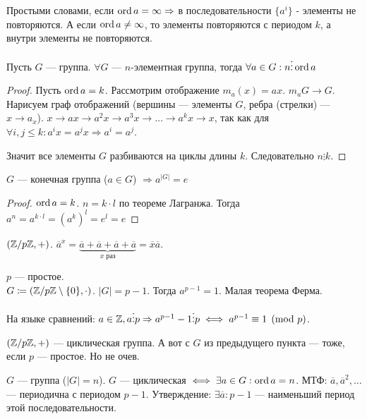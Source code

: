 \slashn
Простыми словами, если $\operatorname{ord} a = \infty \Rightarrow$ в последовательности $\{a^i\}$ - элементы не повторяются. А если  $\operatorname{ord} a \neq \infty$, то элементы повторяются с периодом $k$, а внутри элементы не повторяются. 
\begin{theorem}
    Пусть $G$ --- группа.  $\forall G$ ---  $n$-элементная группа, тогда  $\forall a \in G: n \vdots \operatorname{ord} a$
\end{theorem}
\begin{proof}
    Пусть $\operatorname{ord} a = k$.
    Рассмотрим отображение $m_a(x) = ax$. $m_a G \to G$. Нарисуем граф отображений (вершины --- элементы $G$, ребра (стрелки) ---  $x \to a_x$). $x \to ax \to a^2x \to a^3x \to \ldots \to a^kx \to x$, так как для $\forall i, j \le k: a^i x = a^j x \Rightarrow a^i = a^j$. 

    Значит все элементы $G$ разбиваются на циклы длины  $k$. Следовательно $n \vdots k$.
\end{proof}
\begin{consequence}
    $G$ --- конечная группа ($a \in G$) $\Rightarrow a^{|G|} = e$
\end{consequence}
\begin{proof}
    $\operatorname{ord} a = k$.  $n = k \cdot l$ по теореме Лагранжа. Тогда  $a^n = a^{k\cdot l} = \left(a^k\right)^l = e^l = e$
\end{proof}
\begin{example}
    $(\mathbb{Z} / p\mathbb{Z}, +)$. $\overline{a}^x = \underbrace{\overline{a} + \overline{a} + \overline{a} + \overline{a}}_{x\text{ раз}} = \overline{x}\overline{a}$.
\end{example}
\begin{example}
    $p$ --- простое.\\
    $G \coloneqq (\mathbb{Z} / p\mathbb{Z} \setminus \{0\}, \cdot) $. $|G| = p - 1$. Тогда $a^{p-1} = 1$. Малая теорема Ферма. 
\end{example}
\slashn
На языке сравнений: $a \in \mathbb{Z}, a \vdots p \Rightarrow a^{p-1} - 1 \vdots p \iff a^{p-1} \equiv 1 \pmod{p}$. 
 \begin{example}
     $(\mathbb{Z} / p\mathbb{Z}, +)$ --- циклическая группа. А вот с  $G$ из предыдущего пункта --- тоже, если $p$ --- простое. Но не очев.  
\end{example}
\begin{statement}
    $G$ --- группа ($|G|=n$). $G$ --- циклическая  $\iff \exists a \in G: \operatorname{ord} a = n$.  
    МТФ: $\overline{a}, \overline{a}^2,\ldots$ --- периодична с периодом $p-1$. Утверждение:  $\exists \overline{a}: p-1$ --- наименьший период этой последовательности.
\end{statement}

